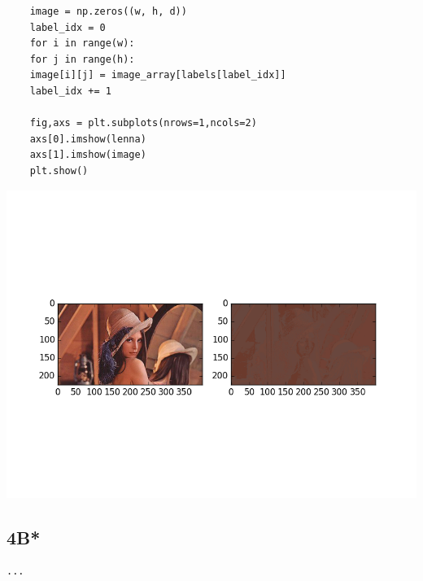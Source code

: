 \documentclass[12pt]{article}
\begin{document}
\begin{flushleft}
\begin{lstlisting}
	image = np.zeros((w, h, d))
	label_idx = 0
	for i in range(w):
	for j in range(h):
	image[i][j] = image_array[labels[label_idx]]
	label_idx += 1
	
	fig,axs = plt.subplots(nrows=1,ncols=2)
	axs[0].imshow(lenna)
	axs[1].imshow(image)
	plt.show()

			\end{lstlisting}
			
			\includegraphics[scale=0.5]{HW3_4A.png}
			\label{fig:graph 4A}
		
		\subsection*{4B*}
		
			\begin{lstlisting}
...
			\end{lstlisting}
		
		
		
	\end{flushleft}
\end{document}
